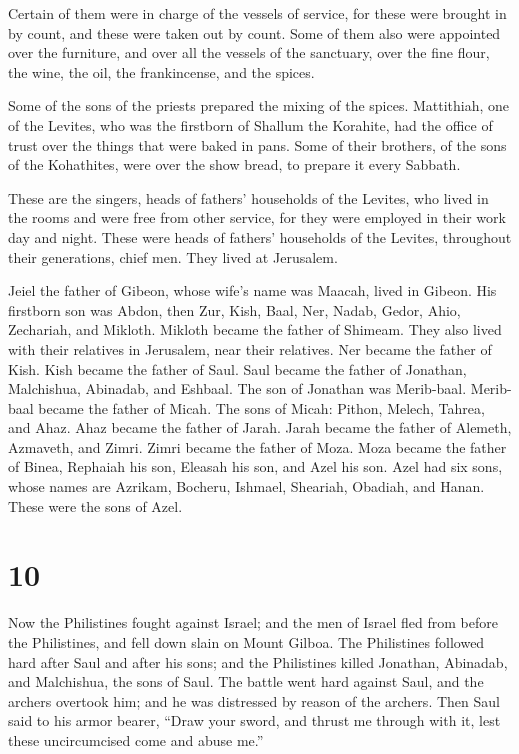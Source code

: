  Certain of them were in charge of the vessels of service,
for these were brought in by count, and these were taken out by count.
 Some of them also were appointed over the furniture, and
over all the vessels of the sanctuary, over the fine flour, the wine,
the oil, the frankincense, and the spices.

 Some of the sons of the priests prepared the mixing of the
spices.  Mattithiah, one of the Levites, who was the
firstborn of Shallum the Korahite, had the office of trust over the
things that were baked in pans.  Some of their brothers, of
the sons of the Kohathites, were over the show bread, to prepare it
every Sabbath.

 These are the singers, heads of fathers' households of the
Levites, who lived in the rooms and were free from other service, for
they were employed in their work day and night.  These were
heads of fathers' households of the Levites, throughout their
generations, chief men. They lived at Jerusalem.

 Jeiel the father of Gibeon, whose wife's name was Maacah,
lived in Gibeon.  His firstborn son was Abdon, then Zur,
Kish, Baal, Ner, Nadab,  Gedor, Ahio, Zechariah, and
Mikloth.  Mikloth became the father of Shimeam. They also
lived with their relatives in Jerusalem, near their relatives.
 Ner became the father of Kish. Kish became the father of
Saul. Saul became the father of Jonathan, Malchishua, Abinadab, and
Eshbaal.  The son of Jonathan was Merib-baal. Merib-baal
became the father of Micah.  The sons of Micah: Pithon,
Melech, Tahrea, and Ahaz.  Ahaz became the father of Jarah.
Jarah became the father of Alemeth, Azmaveth, and Zimri. Zimri became
the father of Moza.  Moza became the father of Binea,
Rephaiah his son, Eleasah his son, and Azel his son.  Azel
had six sons, whose names are Azrikam, Bocheru, Ishmael, Sheariah,
Obadiah, and Hanan. These were the sons of Azel.

\hypertarget{section-9}{%
\section{10}\label{section-9}}

 Now the Philistines fought against Israel; and the men of
Israel fled from before the Philistines, and fell down slain on Mount
Gilboa.  The Philistines followed hard after Saul and after
his sons; and the Philistines killed Jonathan, Abinadab, and Malchishua,
the sons of Saul.  The battle went hard against Saul, and
the archers overtook him; and he was distressed by reason of the
archers.  Then Saul said to his armor bearer, ``Draw your
sword, and thrust me through with it, lest these uncircumcised come and
abuse me.''

